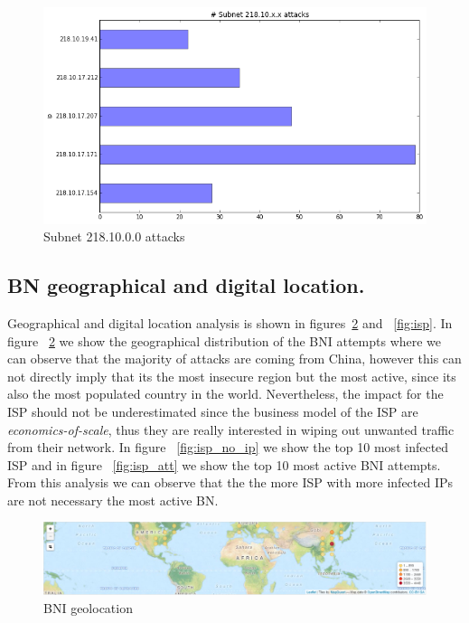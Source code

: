 \begin{figure}[h]
    \caption{Subnet 218.10.0.0 attacks}
    \label{fig:subnet}
    \centering
    \includegraphics[width=0.9\linewidth]{images/subnet}
\end{figure}

\subsection{BN geographical and digital location.}
Geographical and digital location analysis is shown in figures~\ref{fig:map} and ~\ref{fig:isp}. In figure ~\ref{fig:map} we show the geographical distribution of the BNI attempts where we can observe that the majority of attacks are coming from China, however this can not directly imply that its the most insecure region but the most active, since its also the most populated country in the world. Nevertheless, the impact for the ISP should not be underestimated since the business model of the ISP are \textit{economics-of-scale}, thus they are really interested in wiping out unwanted traffic from their network. In figure ~\ref{fig:isp_no_ip} we show the top 10 most infected ISP and in figure ~\ref{fig:isp_att} we show the top 10 most active BNI attempts. From this analysis we can observe that the the more ISP with more infected IPs are not necessary the most active BN.
\begin{figure}[ht]

\caption{BNI geolocation~\cite{map}}
\label{fig:map}
\centering
    \includegraphics[width=0.9\linewidth]{images/map}
\end{figure}


